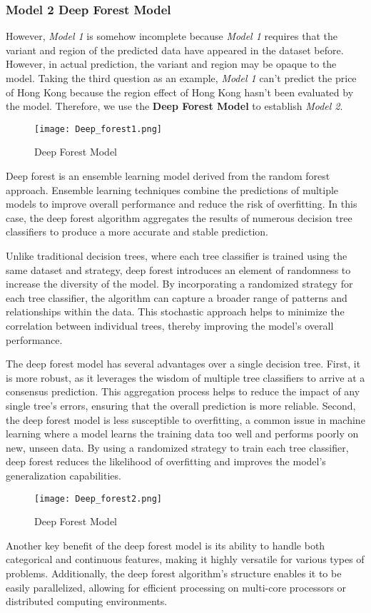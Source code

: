 \documentclass[12pt]{article}  %
\begin{document}
\subsubsection{Model 2 \textemdash  Deep Forest Model}
However, \emph{Model 1} is somehow incomplete because \emph{Model 1} requires that the variant and region of the predicted data have appeared in the dataset before. 
However, in actual prediction, the variant and region may be opaque to the model. 
Taking the third question as an example, \emph{Model 1} can't predict the price of Hong Kong because the region effect of Hong Kong hasn't been evaluated by the model. 
Therefore, we use the \textbf{Deep Forest Model} to establish \emph{Model 2}.

\begin{figure}[htbp]
    \centering
    \texttt{[image: Deep\_forest1.png]}
    \caption{Deep Forest Model}\label{fig:DF1}
\end{figure}

Deep forest is an ensemble learning model derived from the random forest approach. Ensemble learning techniques combine the predictions of multiple models to improve overall performance and reduce the risk of overfitting. In this case, the deep forest algorithm aggregates the results of numerous decision tree classifiers to produce a more accurate and stable prediction.


Unlike traditional decision trees, where each tree classifier is trained using the same dataset and strategy, deep forest introduces an element of randomness to increase the diversity of the model. By incorporating a randomized strategy for each tree classifier, the algorithm can capture a broader range of patterns and relationships within the data. This stochastic approach helps to minimize the correlation between individual trees, thereby improving the model's overall performance.

The deep forest model has several advantages over a single decision tree. First, it is more robust, as it leverages the wisdom of multiple tree classifiers to arrive at a consensus prediction. This aggregation process helps to reduce the impact of any single tree's errors, ensuring that the overall prediction is more reliable. Second, the deep forest model is less susceptible to overfitting, a common issue in machine learning where a model learns the training data too well and performs poorly on new, unseen data. By using a randomized strategy to train each tree classifier, deep forest reduces the likelihood of overfitting and improves the model's generalization capabilities.
\begin{figure}[htbp]
    \centering
    \texttt{[image: Deep\_forest2.png]}
    \caption{Deep Forest Model}\label{fig:DF2}
\end{figure}
Another key benefit of the deep forest model is its ability to handle both categorical and continuous features, making it highly versatile for various types of problems. Additionally, the deep forest algorithm's structure enables it to be easily parallelized, allowing for efficient processing on multi-core processors or distributed computing environments.
\end{document}
